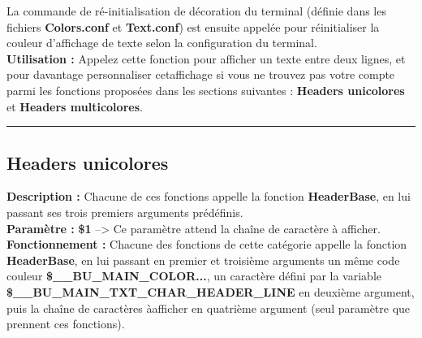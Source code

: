 \documentclass[a4paper,10pt]{article}
\begin{document}
La commande de ré-initialisation de décoration du terminal (définie dans les fichiers \textbf{\color{lime}Colors.conf\color{white}} et \textbf{\color{lime}Text.conf\color{white}}) est ensuite appelée pour réinitialiser la couleur d'affichage de texte selon la configuration du terminal.\\[1\baselineskip]

\textbf{Utilisation :}\linebreak
Appelez cette fonction pour afficher un texte entre deux lignes, et pour davantage personnaliser cet\linebreak affichage si vous ne trouvez pas votre compte parmi les fonctions proposées dans les sections suivantes :
\textbf{\color{green}Headers unicolores\color{white}} et \textbf{\color{green}Headers multicolores\color{white}}.\\[1\baselineskip]


\color{green}\par\noindent\rule{\textwidth}{0.4pt}\color{white}

\color{green}
\subsection{Headers unicolores}\color{white}
\textbf{Description :}\linebreak
Chacune de ces fonctions appelle la fonction \textbf{\color{mauve}HeaderBase\color{white}}, en lui passant ses trois premiers\linebreak
arguments prédéfinis.\\[1\baselineskip]

\textbf{Paramètre :}\linebreak
\textbf{\color{orange}\$1\color{white}} --> Ce paramètre attend la chaîne de caractère à afficher.\\[1\baselineskip]


\textbf{Fonctionnement :}\linebreak
Chacune des fonctions de cette catégorie appelle la fonction \textbf{\color{mauve}HeaderBase\color{white}}, en lui passant en premier et troisième arguments un même code couleur \textbf{\color{orange}\$\_\_BU\_MAIN\_COLOR...\color{white}}, un caractère défini par la variable \textbf{\color{orange}\$\_\_BU\_MAIN\_TXT\_CHAR\_HEADER\_LINE\color{white}} en deuxième argument, puis la chaîne de caractères à\linebreak afficher en quatrième argument (seul paramètre que prennent ces fonctions).\\[1\baselineskip]
\end{document}
